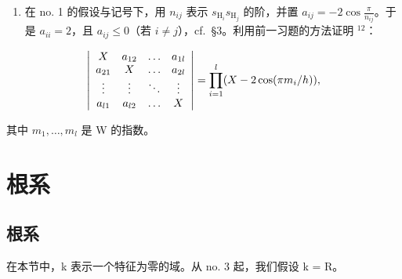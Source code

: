 \begin{enumerate}
\def\labelenumi{\arabic{enumi})}
\setcounter{enumi}{3}
\tightlist
\item
  在 no. 1 的假设与记号下，用 \(n_{ij}\) 表示 \(s_{\mathrm{H}_i}s_{\mathrm{H}_j}\) 的阶，并置 \(a_{ij} = -2\cos \frac{\pi}{n_{ij}}\)。于是 \(a_{ii} = 2\)，且 \(a_{ij} \leqslant 0\)（若 \(i \neq j\)），cf.~§3。利用前一习题的方法证明 \(^{12}\)：
\end{enumerate}

\[
\left| \begin{array}{c c c c} X & a _ {1 2} & \ldots & a _ {1 l} \\ a _ {2 1} & X & \ldots & a _ {2 l} \\ \vdots & \vdots & \ddots & \vdots \\ a _ {l 1} & a _ {l 2} & \ldots & X \end{array} \right| = \prod_ {i = 1} ^ {l} (X - 2 \cos (\pi m _ {i} / h)),
\]

其中 \(m_{1},\ldots ,m_{l}\) 是 W 的指数。

\chapter{根系}

\section{根系}

在本节中，k 表示一个特征为零的域。从 no. 3 起，我们假设 k = R。
